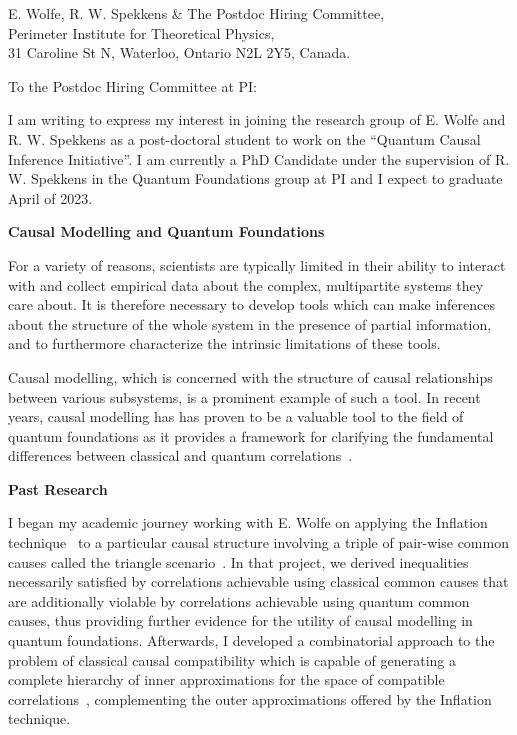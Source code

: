 \documentclass[12pt]{letter}
\begin{document}
\begin{letter}
{
    E. Wolfe, R. W. Spekkens \& The Postdoc Hiring Committee,\\
    Perimeter Institute for Theoretical Physics,\\ 
    31 Caroline St N, Waterloo, Ontario N2L 2Y5, Canada.
}

\opening{To the Postdoc Hiring Committee at PI:}

I am writing to express my interest in joining the research group of E. Wolfe and R. W. Spekkens as a post-doctoral student to work on the ``Quantum Causal Inference Initiative''.
I am currently a PhD Candidate under the supervision of R. W. Spekkens in the Quantum Foundations group at PI and I expect to graduate April of 2023.

\noindent\makebox[\linewidth]{\rule{6cm}{0.4pt}}

\textbf{Causal Modelling and Quantum Foundations}

For a variety of reasons, scientists are typically limited in their ability to interact with and collect empirical data about the complex, multipartite systems they care about.
It is therefore necessary to develop tools which can make inferences about the structure of the whole system in the presence of partial information, and to furthermore characterize the intrinsic limitations of these tools.

Causal modelling, which is concerned with the structure of causal relationships between various subsystems, is a prominent example of such a tool. In recent years, causal modelling has has proven to be a valuable tool to the field of quantum foundations as it provides a framework for clarifying the fundamental differences between classical and quantum correlations~\parencite{wood2015lesson}.

\textbf{Past Research}

I began my academic journey working with E. Wolfe on applying the Inflation technique~\parencite{wolfe2019inflation} to a particular causal structure involving a triple of pair-wise common causes called the triangle scenario~\parencite{fraser2018causal}. In that project, we derived inequalities necessarily satisfied by correlations achievable using classical common causes that are additionally violable by correlations achievable using quantum common causes, thus providing further evidence for the utility of causal modelling in quantum foundations. Afterwards, I developed a combinatorial approach to the problem of classical causal compatibility which is capable of generating a complete hierarchy of inner approximations for the space of compatible correlations~\parencite{fraser2020combinatorial}, complementing the outer approximations offered by the Inflation technique.


\end{letter}
\end{document}
